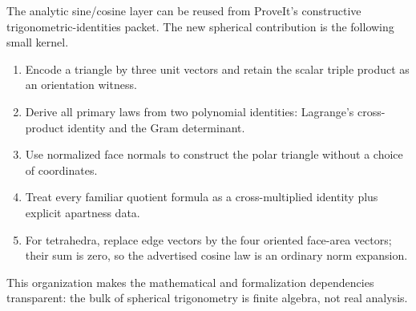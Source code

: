 The analytic sine/cosine layer can be reused from ProveIt's constructive
trigonometric-identities packet.  The new spherical contribution is the
following small kernel.
\begin{enumerate}
\item Encode a triangle by three unit vectors and retain the scalar triple
product as an orientation witness.
\item Derive all primary laws from two polynomial identities: Lagrange's
cross-product identity and the Gram determinant.
\item Use normalized face normals to construct the polar triangle without a
choice of coordinates.
\item Treat every familiar quotient formula as a cross-multiplied identity
plus explicit apartness data.
\item For tetrahedra, replace edge vectors by the four oriented face-area
vectors; their sum is zero, so the advertised cosine law is an ordinary norm
expansion.
\end{enumerate}
This organization makes the mathematical and formalization dependencies
transparent: the bulk of spherical trigonometry is finite algebra, not real
analysis.

